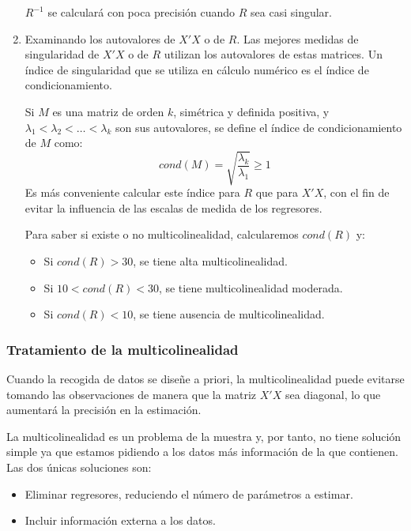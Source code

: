 \documentclass{report}
\theoremstyle{remark}
\theoremstyle{remark}
\theoremstyle{remark}
\theoremstyle{definition}
\theoremstyle{definition}
\theoremstyle{definition}
\begin{document}
\begin{enumerate}
          $R^{-1}$ se calculará con poca precisión cuando $R$ sea casi singular.
    \item Examinando los autovalores de $X'X$ o de $R$.
          Las mejores medidas de singularidad de $X'X$ o de $R$ utilizan los autovalores de estas matrices.
          Un índice de singularidad que se utiliza en cálculo numérico es el índice de condicionamiento.

          Si $M$ es una matriz de orden $k$, simétrica y definida positiva, y $\lambda_1 < \lambda_2 < \dots < \lambda_k$ son sus autovalores, se define el índice de condicionamiento de $M$ como:
          $$cond(M) = \sqrt{\frac{\lambda_k}{\lambda_1}} \geq 1$$
          Es más conveniente calcular este índice para $R$ que para $X'X$, con el fin de evitar la influencia de las escalas de medida de los regresores.

          Para saber si existe o no multicolinealidad, calcularemos $cond(R)$ y:
          \begin{itemize}
              \item Si $cond(R) > 30$, se tiene alta multicolinealidad.
              \item Si $10 < cond(R) < 30$, se tiene multicolinealidad moderada.
              \item Si $cond(R) < 10$, se tiene ausencia de multicolinealidad.
          \end{itemize}
\end{enumerate}

\subsubsection*{Tratamiento de la multicolinealidad}
Cuando la recogida de datos se diseñe a priori, la multicolinealidad puede evitarse tomando las observaciones de manera que la matriz $X'X$ sea diagonal, lo que aumentará la precisión en la estimación.

La multicolinealidad es un problema de la muestra y, por tanto, no tiene solución simple ya que estamos pidiendo a los datos más información de la que contienen.
Las dos únicas soluciones son:
\begin{itemize}
    \item Eliminar regresores, reduciendo el número de parámetros a estimar.
    \item Incluir información externa a los datos.
\end{itemize}
\end{document}
